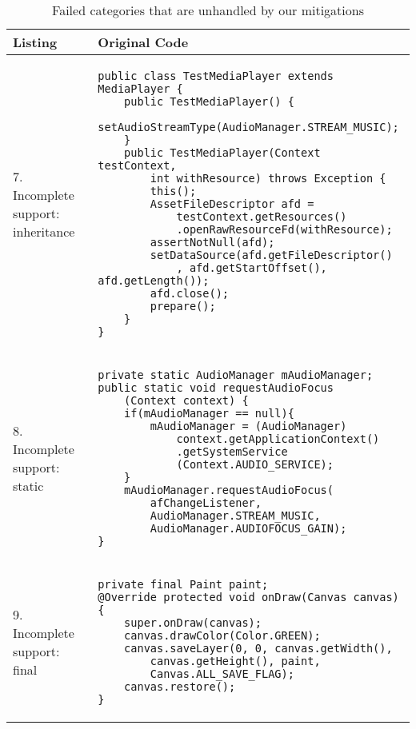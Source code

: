 \begin{table}
	\caption{Failed categories that are unhandled by our mitigations}\label{tab:mitigatefail}
\centering
\begin{tabular}{|p{}|p{}|}
\hline
\textbf{Listing}
  &
  \textbf{Original Code}
 \\ \hline
7. Incomplete support: inheritance
&
\begin{lstlisting}
public class TestMediaPlayer extends MediaPlayer {
    public TestMediaPlayer() {
        setAudioStreamType(AudioManager.STREAM_MUSIC);
    }
    public TestMediaPlayer(Context testContext, 
        int withResource) throws Exception {
        this();
        AssetFileDescriptor afd = 
            testContext.getResources()
            .openRawResourceFd(withResource);
        assertNotNull(afd);
        setDataSource(afd.getFileDescriptor()
            , afd.getStartOffset(), afd.getLength());
        afd.close();
        prepare();
    }
}
\end{lstlisting}
\\ \hline
8. Incomplete support: static
&
\begin{lstlisting}
private static AudioManager mAudioManager;
public static void requestAudioFocus
    (Context context) {
    if(mAudioManager == null){
        mAudioManager = (AudioManager) 
            context.getApplicationContext()
            .getSystemService
            (Context.AUDIO_SERVICE);
    }
    mAudioManager.requestAudioFocus(
        afChangeListener,
        AudioManager.STREAM_MUSIC,
        AudioManager.AUDIOFOCUS_GAIN);
}
\end{lstlisting}
\\ \hline
9. Incomplete support: final
&
\begin{lstlisting}
private final Paint paint;
@Override protected void onDraw(Canvas canvas) {
    super.onDraw(canvas);
    canvas.drawColor(Color.GREEN);
    canvas.saveLayer(0, 0, canvas.getWidth(),
        canvas.getHeight(), paint, 
        Canvas.ALL_SAVE_FLAG);
    canvas.restore();
}
\end{lstlisting}
\\ \hline
 \end{tabular}
 \end{table}

